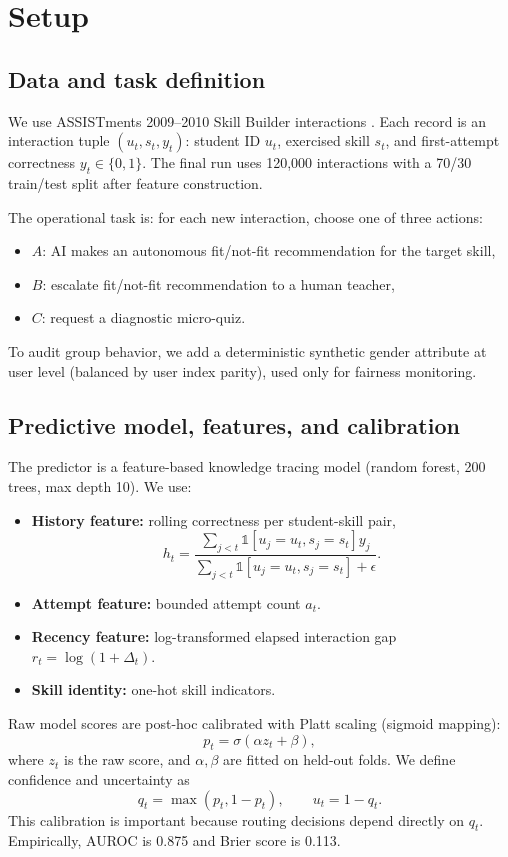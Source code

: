 \documentclass{article}
\begin{document}
\section{Setup}
\subsection{Data and task definition}
We use ASSISTments 2009--2010 Skill Builder interactions \citep{assistments2009}. Each record is an interaction tuple \((u_t, s_t, y_t)\): student ID \(u_t\), exercised skill \(s_t\), and first-attempt correctness \(y_t\in\{0,1\}\). The final run uses 120{,}000 interactions with a 70/30 train/test split after feature construction.

The operational task is: for each new interaction, choose one of three actions:
\begin{itemize}
\item \(A\): AI makes an autonomous fit/not-fit recommendation for the target skill,
\item \(B\): escalate fit/not-fit recommendation to a human teacher,
\item \(C\): request a diagnostic micro-quiz.
\end{itemize}
To audit group behavior, we add a deterministic synthetic gender attribute at user level (balanced by user index parity), used only for fairness monitoring.

\subsection{Predictive model, features, and calibration}
The predictor is a feature-based knowledge tracing model (random forest, 200 trees, max depth 10). We use:
\begin{itemize}
\item \textbf{History feature:} rolling correctness per student-skill pair,
\[
h_t=\frac{\sum_{j<t}\mathds{1}[u_j=u_t, s_j=s_t]y_j}{\sum_{j<t}\mathds{1}[u_j=u_t, s_j=s_t]+\epsilon}.
\]
\item \textbf{Attempt feature:} bounded attempt count \(a_t\).
\item \textbf{Recency feature:} log-transformed elapsed interaction gap \(r_t=\log(1+\Delta_t)\).
\item \textbf{Skill identity:} one-hot skill indicators.
\end{itemize}

Raw model scores are post-hoc calibrated with Platt scaling (sigmoid mapping):
\[
p_t = \sigma(\alpha z_t + \beta),
\]
where \(z_t\) is the raw score, and \(\alpha,\beta\) are fitted on held-out folds. We define confidence and uncertainty as
\[
q_t=\max(p_t,1-p_t), \qquad u_t=1-q_t.
\]
This calibration is important because routing decisions depend directly on \(q_t\). Empirically, AUROC is 0.875 and Brier score is 0.113.
\end{document}
